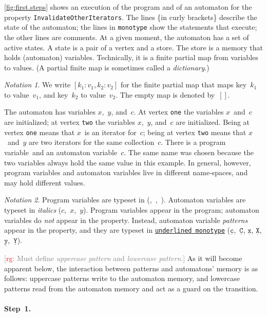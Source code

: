 \documentclass[preprint]{sigplanconf} %
\newcommand{\note}[2]{\textcolor{gray}{[\textcolor{red}{#1}: #2]}}
\newcommand{\rg}[1]{\note{rg}{#1}}
\newcommand{\pattern}[1]{\ensuremath{\mathtt{\underline{#1}}}}
\theoremstyle{definition}
\theoremstyle{remark}
\newtheorem{notation}{Notation}
\begin{document}
\autoref{fig:first.steps} shows an execution of the program and of an automaton for the property \texttt{InvalidateOtherIterators}.
The lines \{in curly brackets\} describe the state of the automaton;
the lines in \texttt{monotype} show the statements that execute;
the other lines are comments.
At a given moment, the automaton has a set of active states.
A state is a pair of a vertex and a store.
The store is a memory that holds (automaton) variables.
Technically, it is a finite partial map from variables to values.
(A partial finite map is sometimes called a \emph{dictionary}.)

\begin{notation}
We write $[k_1:v_1,k_2:v_2]$ for the finite partial map that maps key~$k_1$ to value~$v_1$, and key~$k_2$ to value~$v_2$.
The empty map is denoted by~$[]$.
\end{notation}

The automaton has variables $x$,~$y$, and~$c$.
At vertex \texttt{one} the variables $x$~and~$c$ are initialized;
at vertex \texttt{two} the variables $x$,~$y$, and~$c$ are initialized.
Being at vertex \texttt{one} means that $x$~is an iterator for~$c$;
being at vertex \texttt{two} means that $x$~and~$y$ are two iterators for the same collection~$c$.
There is a program variable~\Verb@c@ and an automaton variable~$c$.
The same name was chosen because the two variables always hold the same value in this example.
In general, however, program variables and automaton variables live in different name-spaces, and may hold different values.

\begin{notation}
Program variables are typeset in \Verb@monotype@ (\Verb@c@,~\Verb@i@,~\Verb@j@).
Automaton variables are typeset in \textit{italics} ($c$,~$x$,~$y$).
Program variables appear in the program;
automaton variables do \emph{not} appear in the property.
Instead, automaton variable \emph{patterns} appear in the property, and they are typeset in \texttt{\underline{underlined monotype}} (\pattern c,~\pattern C, \pattern x, \pattern X, \pattern y,~\pattern Y).
\end{notation}

\rg{Must define \emph{uppercase pattern} and \emph{lowercase pattern}.}
As it will become apparent below, the interaction between patterns and automatons' memory is as follows: uppercase patterns write to the automaton memory, and lowercase patterns read from the automaton memory and act as a guard on the transition.

\paragraph{Step~1.}
\end{document}
